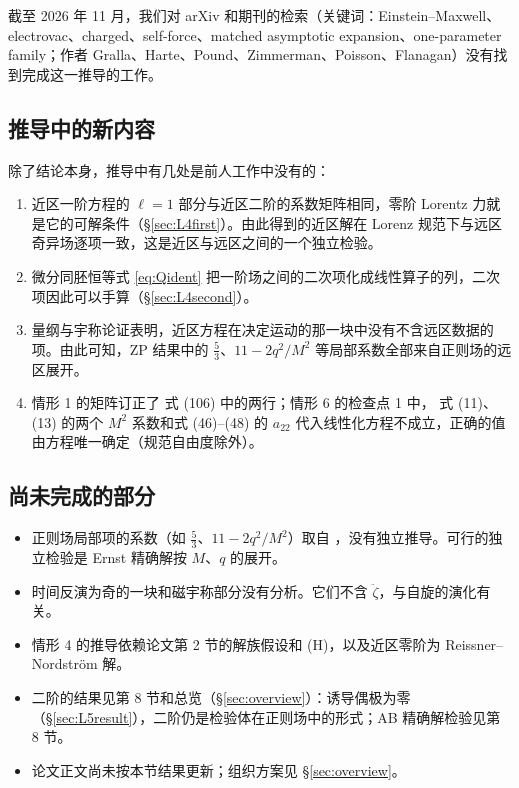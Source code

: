 \documentclass[11pt,a4paper]{ctexart}
\numberwithin{equation}{section}
\begin{document}
截至 2026 年 11 月，我们对 arXiv 和期刊的检索（关键词：Einstein--Maxwell、electrovac、charged、self-force、matched asymptotic expansion、one-parameter family；作者 Gralla、Harte、Pound、Zimmerman、Poisson、Flanagan）没有找到完成这一推导的工作。

\subsection{推导中的新内容}

除了结论本身，推导中有几处是前人工作中没有的：
\begin{enumerate}
\item 近区一阶方程的 $\ell=1$ 部分与近区二阶的系数矩阵相同，零阶 Lorentz 力就是它的可解条件（\S\ref{sec:L4first}）。由此得到的近区解在 Lorenz 规范下与远区奇异场逐项一致，这是近区与远区之间的一个独立检验。
\item 微分同胚恒等式 \eqref{eq:Qident} 把一阶场之间的二次项化成线性算子的列，二次项因此可以手算（\S\ref{sec:L4second}）。
\item 量纲与宇称论证表明，近区方程在决定运动的那一块中没有不含远区数据的项。由此可知，ZP 结果中的 $\tfrac53$、$11-2q^2/M^2$ 等局部系数全部来自正则场的远区展开。
\item 情形 1 的矩阵订正了 \citet{GrallaWald2008} 式 (106) 中的两行；情形 6 的检查点 1 中，\citet{Gralla2012} 式 (11)、(13) 的两个 $M^2$ 系数和式 (46)--(48) 的 $a_{22}$ 代入线性化方程不成立，正确的值由方程唯一确定（规范自由度除外）。
\end{enumerate}

\subsection{尚未完成的部分}
\begin{itemize}
\item 正则场局部项的系数（如 $\tfrac53$、$11-2q^2/M^2$）取自 \citet{ZimmermanPoisson2014}，没有独立推导。可行的独立检验是 Ernst 精确解按 $M$、$q$ 的展开。
\item 时间反演为奇的一块和磁宇称部分没有分析。它们不含 $\ddot\zeta$，与自旋的演化有关。
\item 情形 4 的推导依赖论文第 2 节的解族假设和 (H)，以及近区零阶为 Reissner--Nordstr\"om 解。
\item 二阶的结果见第 8 节和总览（\S\ref{sec:overview}）：诱导偶极为零（\S\ref{sec:L5result}），二阶仍是检验体在正则场中的形式；AB 精确解检验见第 8 节。
\item 论文正文尚未按本节结果更新；组织方案见 \S\ref{sec:overview}。
\end{itemize}
\end{document}
